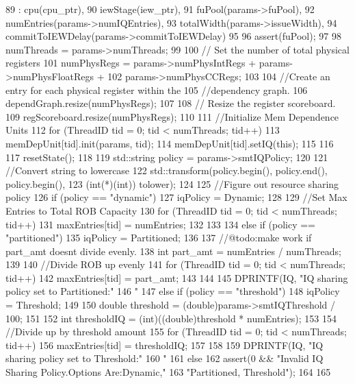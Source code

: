 \begin{DoxyCode}
89     : cpu(cpu_ptr),
90       iewStage(iew_ptr),
91       fuPool(params->fuPool),
92       numEntries(params->numIQEntries),
93       totalWidth(params->issueWidth),
94       commitToIEWDelay(params->commitToIEWDelay)
95 {
96     assert(fuPool);
97 
98     numThreads = params->numThreads;
99 
100     // Set the number of total physical registers
101     numPhysRegs = params->numPhysIntRegs + params->numPhysFloatRegs +
102         params->numPhysCCRegs;
103 
104     //Create an entry for each physical register within the
105     //dependency graph.
106     dependGraph.resize(numPhysRegs);
107 
108     // Resize the register scoreboard.
109     regScoreboard.resize(numPhysRegs);
110 
111     //Initialize Mem Dependence Units
112     for (ThreadID tid = 0; tid < numThreads; tid++) {
113         memDepUnit[tid].init(params, tid);
114         memDepUnit[tid].setIQ(this);
115     }
116 
117     resetState();
118 
119     std::string policy = params->smtIQPolicy;
120 
121     //Convert string to lowercase
122     std::transform(policy.begin(), policy.end(), policy.begin(),
123                    (int(*)(int)) tolower);
124 
125     //Figure out resource sharing policy
126     if (policy == "dynamic") {
127         iqPolicy = Dynamic;
128 
129         //Set Max Entries to Total ROB Capacity
130         for (ThreadID tid = 0; tid < numThreads; tid++) {
131             maxEntries[tid] = numEntries;
132         }
133 
134     } else if (policy == "partitioned") {
135         iqPolicy = Partitioned;
136 
137         //@todo:make work if part_amt doesnt divide evenly.
138         int part_amt = numEntries / numThreads;
139 
140         //Divide ROB up evenly
141         for (ThreadID tid = 0; tid < numThreads; tid++) {
142             maxEntries[tid] = part_amt;
143         }
144 
145         DPRINTF(IQ, "IQ sharing policy set to Partitioned:"
146                 "%
147     } else if (policy == "threshold") {
148         iqPolicy = Threshold;
149 
150         double threshold =  (double)params->smtIQThreshold / 100;
151 
152         int thresholdIQ = (int)((double)threshold * numEntries);
153 
154         //Divide up by threshold amount
155         for (ThreadID tid = 0; tid < numThreads; tid++) {
156             maxEntries[tid] = thresholdIQ;
157         }
158 
159         DPRINTF(IQ, "IQ sharing policy set to Threshold:"
160                 "%
161    } else {
162        assert(0 && "Invalid IQ Sharing Policy.Options Are:{Dynamic,"
163               "Partitioned, Threshold}");
164    }
165 }
\end{DoxyCode}
